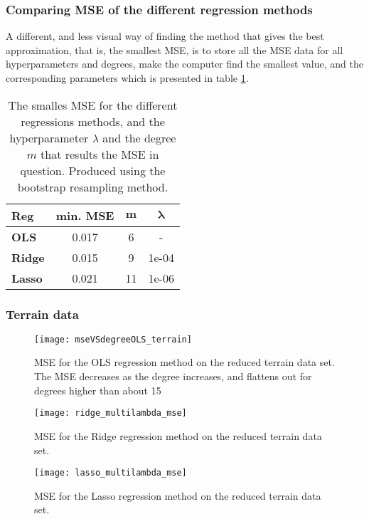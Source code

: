 \subsubsection{Comparing MSE of the different regression methods}
A different, and less visual way of finding the method that gives the best approximation, that is, the smallest MSE, is to store all the MSE data for all hyperparameters and degrees, make the computer find the smallest value, and the corresponding parameters which is presented in table \ref{tab:minerrorFRANKE}.
\begin{table}[htbp]
\caption{The smalles MSE for the different regressions methods, and the hyperparameter $\lambda$ and the degree $m$ that results the MSE in question. Produced using the bootstrap resampling method.}
\centering
\begin{tabular}[width=0.5\textwidth]{lccc}
\hline
\textbf{Reg} & \textbf{min. MSE} & $\boldsymbol{m}$ & $\boldsymbol{\lambda}$ \\
\hline
\textbf{OLS} & 0.017 & 6 & - \\
\textbf{Ridge} & 0.015 & 9 & 1e-04 \\
\textbf{Lasso} & 0.021 & 11 & 1e-06
\end{tabular}
\label{tab:minerrorFRANKE}
\end{table}

\subsubsection{Terrain data}

\begin{figure}[htbp]
	\centering
	\texttt{[image: mseVSdegreeOLS\_terrain]}
	\caption{MSE for the OLS regression method on the reduced terrain data set. The MSE decreases as the degree increases, and flattens out for degrees higher than about 15}
	\label{fig:mseVSdegreeOLSterrain}
\end{figure}

\begin{figure}[htbp]
	\centering
	\texttt{[image: ridge\_multilambda\_mse]}
	\caption{MSE for the Ridge regression method on the reduced terrain data set.}
	\label{fig:mseVSdegreeLASSOterrain}
\end{figure}

\begin{figure}[htbp]
	\centering
	\texttt{[image: lasso\_multilambda\_mse]}
	\caption{MSE for the Lasso regression method on the reduced terrain data set.}
	\label{fig:mseVSdegreeRIDGEterrain}
\end{figure}

\vfill
\newpage
